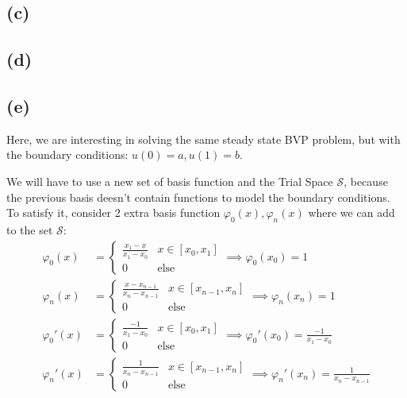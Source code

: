\documentclass[]{article}
\begin{document}
    \subsection*{(c)}

    \subsection*{(d)}
    
    \subsection*{(e)}
        \hspace{1.1em}
        Here, we are interesting in solving the same steady state BVP problem, but with the boundary conditions: $u(0) = a, u(1) = b$. 
        \par
        We will have to use a new set of basis function and the Trial Space $\mathcal{S}$, because the previous basis deesn't contain functions to model the boundary conditions. To satisfy it, consider 2 extra basis function $\varphi_0(x), \varphi_{n}(x)$ where we can add to the set $\mathcal{S}$: 
        \begin{align*}\tag{1.e.1}\label{eqn:1.e.1}
            \varphi_0(x) &= 
            \begin{cases}
                \frac{x_1 - x}{x_1 - x_0}
                & 
                x \in [x_0, x_1]
                \\
                0 & \text{else}
            \end{cases}
            \implies 
            \varphi_0(x_0) = 1
            \\
            \varphi_{n}(x) &= 
            \begin{cases}
                \frac{x - x_{n - 1}}{x_n - x_{n - 1}}
                & 
                x\in [x_{n - 1}, x_n]
                \\
                0 & \text{else}
            \end{cases}
            \implies 
            \varphi_n(x_n) = 1
            \\
            \varphi_0'(x) &= \begin{cases}
                \frac{-1}{x_1 - x_0} & x\in [x_0, x_1]
                \\
                0 & \text{else}
            \end{cases}
            \implies \varphi_0'(x_0) = \frac{-1}{x_1 - x_0}
            \\
            \varphi_n'(x) &= 
            \begin{cases}
                \frac{1}{x_n - x_{n - 1}} & x\in [x_{n - 1}, x_n]
                \\
                0 & \text{else}
            \end{cases}
            \implies \varphi_n'(x_n) = \frac{1}{x_n - x_{n - 1}}
        \end{align*}
\end{document}
